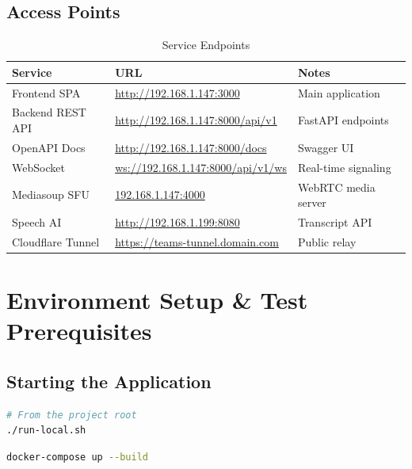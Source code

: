 \documentclass[11pt,a4paper]{report}
\begin{document}
\section{Access Points}

\begin{xltabular}{\textwidth}{|L{3.2cm}|L{6.5cm}|X|}
\caption{Service Endpoints} \\
\hline
{} \textbf{Service} & \textbf{URL} & \textbf{Notes} \\ \hline
\endhead
Frontend SPA      & \url{http://192.168.1.147:3000}      & Main application \\ \hline
Backend REST API  & \url{http://192.168.1.147:8000/api/v1} & FastAPI endpoints \\ \hline
OpenAPI Docs      & \url{http://192.168.1.147:8000/docs}   & Swagger UI \\ \hline
WebSocket         & \url{ws://192.168.1.147:8000/api/v1/ws} & Real-time signaling \\ \hline
Mediasoup SFU     & \url{192.168.1.147:4000}             & WebRTC media server \\ \hline
Speech AI         & \url{http://192.168.1.199:8080}      & Transcript API \\ \hline
Cloudflare Tunnel & \url{https://teams-tunnel.domain.com} & Public relay \\ \hline
\end{xltabular}

\chapter{Environment Setup \& Test Prerequisites}

\section{Starting the Application}

\begin{lstlisting}[language=bash, caption=Start all services (local)]
# From the project root
./run-local.sh
\end{lstlisting}

\begin{lstlisting}[language=bash, caption=Start via Docker Compose (production)]
docker-compose up --build
\end{lstlisting}
\end{document}
